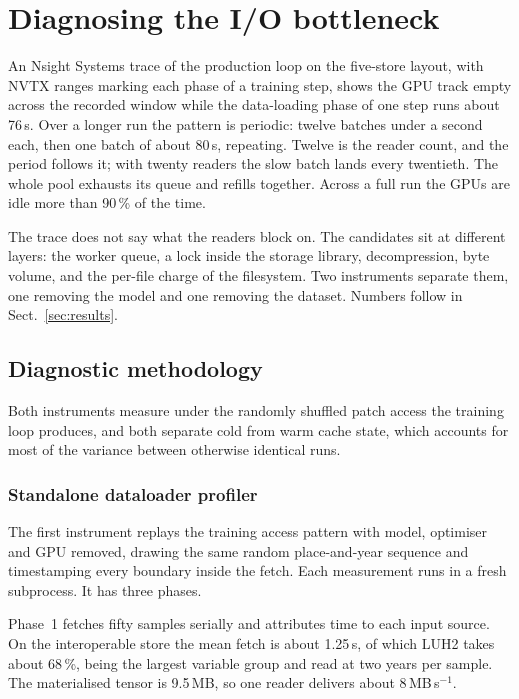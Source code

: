 \documentclass[gmd, manuscript]{copernicus}
\begin{document}
\section{Diagnosing the I/O bottleneck}
\label{sec:diagnosis}

An Nsight Systems trace \citep{nsight} of the production loop on the five-store layout, with
NVTX ranges marking each phase of a training step, shows the GPU track empty across the
recorded window while the data-loading phase of one step runs about 76\,s. Over a longer run
the pattern is periodic: twelve batches under a second each, then one batch of about 80\,s,
repeating. Twelve is the reader count, and the period follows it; with twenty readers the slow
batch lands every twentieth. The whole pool exhausts its queue and refills together. Across a
full run the GPUs are idle more than 90\,\% of the time.

The trace does not say what the readers block on. The candidates sit at different layers: the
worker queue, a lock inside the storage library, decompression, byte volume, and the per-file
charge of the filesystem. Two instruments separate them, one removing the model and one
removing the dataset. Numbers follow in Sect.~\ref{sec:results}.

\subsection{Diagnostic methodology}
\label{sec:methodology}

Both instruments measure under the randomly shuffled patch access the training loop
produces, and both separate cold from warm cache state, which accounts for most of the
variance between otherwise identical runs.

\subsubsection{Standalone dataloader profiler}
\label{sec:profiler}

The first instrument replays the training access pattern with model, optimiser and GPU
removed, drawing the same random place-and-year sequence and timestamping every boundary
inside the fetch. Each measurement runs in a fresh subprocess. It has three phases.

Phase~1 fetches fifty samples serially and attributes time to each input source. On the
interoperable store the mean fetch is about 1.25\,s, of which LUH2 takes about 68\,\%, being
the largest variable group and read at two years per sample. The materialised tensor is
9.5\,MB, so one reader delivers about 8\,MB\,s$^{-1}$.
\end{document}
